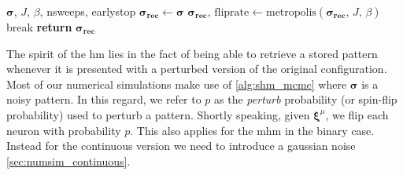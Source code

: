 \documentclass[\rootdir/main.tex]{subfiles}
\begin{document}
\begin{algorithm}
    \caption{\acrlong{mcmc} for the \acrlong{shm}}
    \label{alg:shm_mcmc}
    \begin{algorithmic}[1]
    \Require $\symbf{\sigma}$, $J$, $\beta$, nsweeps, earlystop
        \State $\symbf{\sigma_{\text{rec}}} \gets \symbf{\sigma}$ 
        \State $\symbf{\sigma_{\text{rec}}},\, \text{fliprate} \gets \text{metropolis}\left(\symbf{\sigma_{\text{rec}}},\, J,\, \beta \right)$  
            \State break
        \EndIf
        \EndFor
    \State \textbf{return} $\symbf{\sigma_{\text{rec}}}$
    \end{algorithmic}
\end{algorithm}

The spirit of the \acrlong{hm} lies in the fact of being able to retrieve a stored pattern whenever it is presented with a perturbed version of the original configuration.\\
Most of our numerical simulations make use of \cref{alg:shm_mcmc} where $\symbf{\sigma}$ is a noisy pattern. In this regard, we refer to $p$ as the \emph{perturb} probability (or spin-flip probability) used to perturb a pattern. Shortly speaking, given $\symbf{\xi}^{\mu}$, we flip each neuron with probability $p$. This also applies for the \acrlong{mhm} in the binary case. Instead for the continuous version we need to introduce a gaussian noise \cref{sec:numsim_continuous}.

\end{document}
